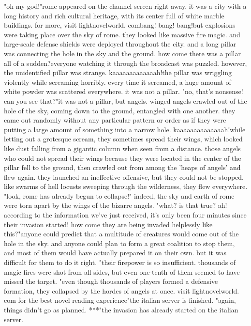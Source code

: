 "oh my god!"rome appeared on the channel screen right away.
 it was a city with a long history and rich cultural heritage, with its center full of white marble buildings.
for more, visit lightnov­elworld.
combang! bang! bang!but explosions were taking place over the sky of rome.
 they looked like massive fire magic.
 and large-scale defense shields were deployed throughout the city.
 and a long pillar was connecting the hole in the sky and the ground.
how come there was a pillar all of a sudden?everyone watching it through the broadcast was puzzled.
 however, the unidentified pillar was strange.
kaaaaaaaaaaaaah!the pillar was wriggling violently while screaming horribly.
every time it screamed, a huge amount of white powder was scattered everywhere.
it was not a pillar.
"no, that's nonsense! can you see that?"it was not a pillar, but angels.
 winged angels crawled out of the hole of the sky, coming down to the ground, entangled with one another.
 they came out randomly without any particular pattern or order as if they were putting a large amount of something into a narrow hole.
kaaaaaaaaaaaaaah!while letting out a grotesque scream, they sometimes spread their wings, which looked like dust falling from a gigantic column when seen from a distance.
those angels who could not spread their wings because they were located in the center of the pillar fell to the ground, then crawled out from among the 'heaps of angels' and flew again.
they launched an ineffective offensive, but they could not be stopped.
like swarms of hell locusts sweeping through the wilderness, they flew everywhere.
"look, rome has already begun to collapse!"
indeed, the sky and earth of rome were torn apart by the wings of the bizarre angels.
"what? is that true? ah! according to the information we've just received, it's only been four minutes since their invasion started! how come they are being invaded helplessly like this?"anyone could predict that a multitude of creatures would come out of the hole in the sky.
and anyone could plan to form a great coalition to stop them, and most of them would have actually prepared it on their own.
 but it was difficult for them to do it right.
"their firepower is so insufficient.
 thousands of magic fires were shot from all sides, but even one-tenth of them seemed to have missed the target.
"even though thousands of players formed a defensive formation, they collapsed by the hordes of angels at once.
visit lightnovelworld.
com for the best novel reading experience"the italian server is finished.
"again, things didn't go as planned.
***"the invasion has already started on the italian server.
